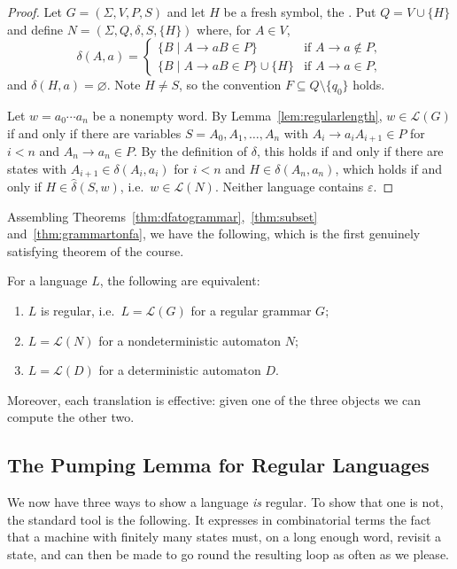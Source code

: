 \documentclass[a4paper]{scrartcl}
\newcommand{\lang}{\mathcal{L}}
\newcommand{\eps}{\varepsilon}
\begin{document}
\begin{proof}
	Let $G = (\Sigma, V, P, S)$ and let $H$ be a fresh symbol, the . Put $Q = V \cup \{H\}$ and define $N = (\Sigma, Q, \delta, S, \{H\})$ where, for $A \in V$,
	$$\delta(A, a) = \begin{cases} \{B \mid A \to aB \in P\} & \text{if } A \to a \notin P, \\ \{B \mid A \to aB \in P\} \cup \{H\} & \text{if } A \to a \in P,\end{cases}$$
	and $\delta(H,a) = \varnothing$. Note $H \neq S$, so the convention $F \subseteq Q \setminus \{q_0\}$ holds.

	Let $w = a_0\cdots a_n$ be a nonempty word. By Lemma~\ref{lem:regularlength}, $w \in \lang(G)$ if and only if there are variables $S = A_0, A_1, \dots, A_n$ with $A_i \to a_iA_{i+1} \in P$ for $i < n$ and $A_n \to a_n \in P$. By the definition of $\delta$, this holds if and only if there are states with $A_{i+1} \in \delta(A_i, a_i)$ for $i < n$ and $H \in \delta(A_n, a_n)$, which holds if and only if $H \in \hat\delta(S, w)$, i.e.\ $w \in \lang(N)$. Neither language contains $\eps$.
\end{proof}

Assembling Theorems~\ref{thm:dfatogrammar},~\ref{thm:subset} and~\ref{thm:grammartonfa}, we have the following, which is the first genuinely satisfying theorem of the course.

\begin{corollary}\label{cor:threeequiv}
	For a language $L$, the following are equivalent:
	\begin{enumerate}[label=(\roman*)]
		\item $L$ is regular, i.e.\ $L = \lang(G)$ for a regular grammar $G$;
		\item $L = \lang(N)$ for a nondeterministic automaton $N$;
		\item $L = \lang(D)$ for a deterministic automaton $D$.
	\end{enumerate}
	Moreover, each translation is effective: given one of the three objects we can compute the other two.
\end{corollary}

\subsection{The Pumping Lemma for Regular Languages}

We now have three ways to show a language \emph{is} regular. To show that one is not, the standard tool is the following. It expresses in combinatorial terms the fact that a machine with finitely many states must, on a long enough word, revisit a state, and can then be made to go round the resulting loop as often as we please.
\end{document}
